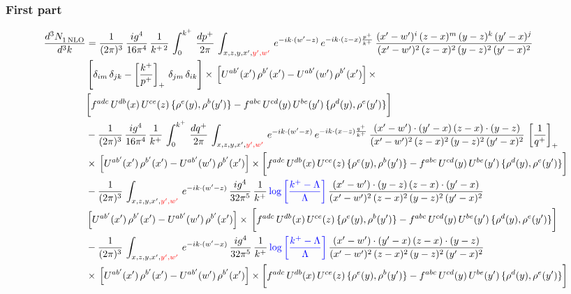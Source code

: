 \documentclass[9pt]{article}
\numberwithin{equation}{section}
\begin{document}
\subsubsection*{First part}
\begin{align}
     \frac{d^{3}N_{1\,\rm NLO}^{\rm}}{d^{3}k}  & = \frac{1}{(2\pi)^{3}}\, \frac{ig^{4}}{16\pi^{4}}\, \frac{1}{k^{+\,2}}\,\int_{0}^{k^{+}}\, \frac{dp^{+}}{2\pi}\,\int_{x,z,y,x',{\color{red}y',w'}}\,e^{-ik\cdot (w^\prime-z)}\,e^{-ik\cdot (z-x)\frac{p^{+}}{k^{+}}}\,\frac{(x'-w')^{i}\,(z-x)^{m}\,(y-z)^{k}\,(y'-x)^{j}}{(x'-w')^{2}\,(z-x)^{2}\,(y-z)^{2}\,(y'-x)^{2}}\,\notag \\ & \left[\delta_{im}\,\delta_{jk}-\left[\frac{k^{+}}{p^{+}}\right]_{+}\, \delta_{jm}\,\delta_{ik}\right]\times\, \left[U^{ab'}(x')\,\rho^{b'}(x')-U^{ab'}(w')\,\rho^{b'}(x')\right]\times\notag \\ & \bigg[f^{adc}\,U^{db}(x)\,U^{ce}(z)\, \{\rho^{e}(y),\rho^{b}(y')\}-f^{abc}\,U^{cd}(y)\,U^{be}(y')\, \{\rho^{d}(y),\rho^{e}(y')\}\bigg]\notag \\ & -\frac{1}{(2\pi)^{3}}\, \frac{ig^{4}}{16\pi^{4}}\, \frac{1}{k^{+}}\,\int_{0}^{k^{+}}\, \frac{dq^{+}}{2\pi}\,\int_{x,z,y,x',{\color{red}y',w'}}\,e^{-ik\cdot (w^\prime-x)}\,e^{-ik\cdot (x-z)\frac{q^{+}}{k^{+}}}\,\frac{(x'-w')\cdot (y'-x)\,(z-x)\cdot (y-z)}{(x'-w')^{2}\,(z-x)^{2}\,(y-z)^{2}\,(y'-x)^{2}}\,\left[\frac{1}{q^{+}}\right]_{+}\notag \\ & \times\, \left[U^{ab'}(x')\,\rho^{b'}(x')-U^{ab'}(w')\,\rho^{b'}(x')\right]\times \bigg[f^{adc}\,U^{db}(x)\,U^{ce}(z)\, \{\rho^{e}(y),\rho^{b}(y')\}-f^{abc}\,U^{cd}(y)\,U^{be}(y')\, \{\rho^{d}(y),\rho^{e}(y')\}\bigg]\notag \\ & -\frac{1}{(2\pi)^{3}}\, \int_{x,z,y,x',{\color{red}y',w'}}\,e^{-ik\cdot (w^\prime-z)}\,\frac{ig^{4}}{32\pi^{5}}\, \frac{1}{k^{+}}\,{\color{blue}\log{\left[\frac{k^{+}-\Lambda}{\Lambda}\right]}}\,\frac{(x'-w')\cdot (y-z)\,(z-x)\cdot (y'-x)}{(x'-w')^{2}\,(z-x)^{2}\,(y-z)^{2}\,(y'-x)^{2}}\,\notag \\ & \left[U^{ab'}(x')\,\rho^{b'}(x')-U^{ab'}(w')\,\rho^{b'}(x')\right]\times\, \bigg[f^{adc}\,U^{db}(x)\,U^{ce}(z)\, \{\rho^{e}(y),\rho^{b}(y')\}-f^{abc}\,U^{cd}(y)\,U^{be}(y')\, \{\rho^{d}(y),\rho^{e}(y')\}\bigg]\notag \\ &  -\frac{1}{(2\pi)^{3}}\, \int_{x,z,y,x',{\color{red}y',w'}}\,e^{-ik\cdot (w^\prime-x)}\,\frac{ig^{4}}{32\pi^{5}}\, \frac{1}{k^{+}}\,{\color{blue}\log{\left[\frac{k^{+}-\Lambda}{\Lambda}\right]}}\,\frac{(x'-w')\cdot (y'-x)\,(z-x)\cdot (y-z)}{(x'-w')^{2}\,(z-x)^{2}\,(y-z)^{2}\,(y'-x)^{2}}\notag \\ & \times\, \left[U^{ab'}(x')\,\rho^{b'}(x')-U^{ab'}(w')\,\rho^{b'}(x')\right]\times \bigg[f^{adc}\,U^{db}(x)\,U^{ce}(z)\, \{\rho^{e}(y),\rho^{b}(y')\}-f^{abc}\,U^{cd}(y)\,U^{be}(y')\, \{\rho^{d}(y),\rho^{e}(y')\}\bigg]
\end{align}
\end{document}
